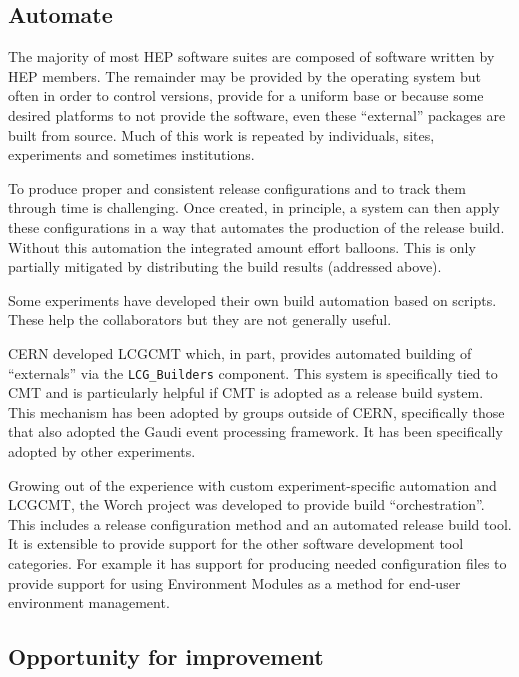\subsection{Automate}

The majority of most HEP software suites are composed of software
written by HEP members.  The remainder may be provided by the
operating system but often in order to control versions, provide for a
uniform base or because some desired platforms to not provide the
software, even these ``external'' packages are built from source.
Much of this work is repeated by individuals, sites, experiments and
sometimes institutions.

To produce proper and consistent release configurations and to track
them through time is challenging.  Once created, in principle, a
system can then apply these configurations in a way that automates the
production of the release build.  Without this automation the
integrated amount effort balloons.  This is only partially mitigated by
distributing the build results (addressed above).

Some experiments have developed their own build automation based on
scripts.  These help the collaborators but they are not generally
useful.

CERN developed LCGCMT which, in part, provides automated building of
``externals'' via the \verb|LCG_Builders| component.  This system is
specifically tied to CMT and is particularly helpful if CMT is adopted
as a release build system.  This mechanism has been adopted by groups
outside of CERN, specifically those that also adopted the Gaudi event
processing framework.  It has been specifically adopted by other
experiments.

Growing out of the experience with custom experiment-specific
automation and LCGCMT, the Worch project was developed to provide
build ``orchestration''.  This includes a release configuration method
and an automated release build tool.  It is extensible to provide
support for the other software development tool categories.  For
example it has support for producing needed configuration files to
provide support for using Environment Modules as a method for end-user
environment management.


\subsection{Opportunity for improvement}

